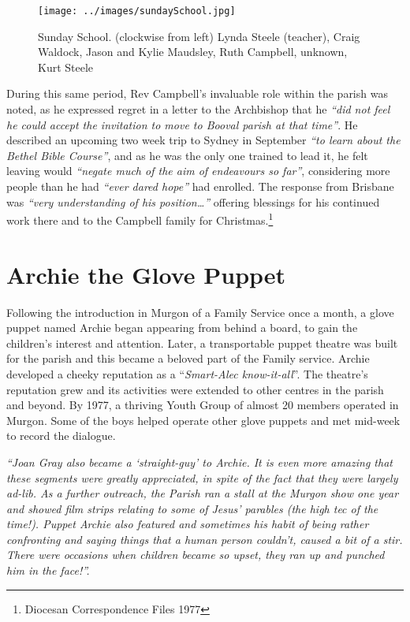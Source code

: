 \begin{figure}[!htb]
\begin{center}
\texttt{[image: ../images/sundaySchool.jpg]}
\caption{Sunday School. (clockwise from left) Lynda Steele (teacher), Craig Waldock, Jason and Kylie Maudsley, Ruth Campbell, unknown, Kurt Steele}
\end{center}
\end{figure}




During this same period, Rev Campbell's invaluable role within the parish was noted, as he expressed regret in a letter to the Archbishop that he \emph{``did not feel he could accept the invitation to move to Booval parish at that time''}. He described an upcoming two week trip to Sydney in September \emph{``to learn about the Bethel Bible Course''}, and as he was the only one trained to lead it, he felt leaving would \emph{``negate much of the aim of endeavours so far''}, considering more people than he had \emph{``ever dared hope''} had enrolled. The response from Brisbane was \emph{``very understanding of his position\ldots''} offering blessings for his continued work there and to the Campbell family for Christmas.\footnote{Diocesan Correspondence Files 1977}


\section{Archie the Glove Puppet}



Following the introduction in Murgon of a Family Service once a month, a glove puppet named Archie began appearing from behind a board, to gain the children's interest and attention. Later, a transportable puppet theatre was built for the parish and this became a beloved part of the Family service. Archie developed a cheeky reputation as a ``\emph{Smart-Alec know-it-all}''. The theatre's reputation grew and its activities were extended to other centres in the parish and beyond. By 1977, a thriving Youth Group of almost 20 members operated in Murgon. Some of the boys helped operate other glove puppets and met mid-week to record the dialogue.



\emph{``Joan Gray also became a `straight-guy' to Archie. It is even more amazing that these segments were greatly appreciated, in spite of the fact that they were largely ad-lib. As a further outreach, the Parish ran a stall at the Murgon show one year and showed film strips relating to some of Jesus' parables (the high tec of the time!). Puppet Archie also featured and sometimes his habit of being rather confronting and saying things that a human person couldn't, caused a bit of a stir. There were occasions when children became so upset, they ran up and punched him in the face!''.}



